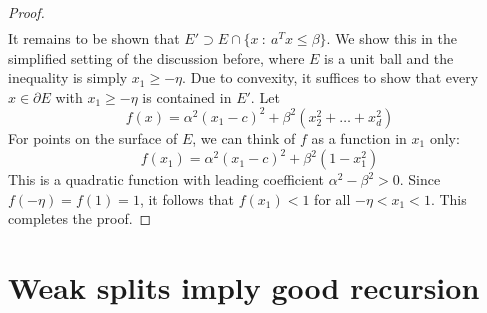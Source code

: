 \begin{proof}
\begin{align*}
  \end{align*}
  It remains to be shown that $E' \supset E \cap \{ x ~:~ a^Tx \leq \beta \}$.
  We show this in the simplified setting of the discussion before,
  where $E$ is a unit ball and the inequality is simply $x_1 \geq -\eta$.
  Due to convexity, it suffices to show that every $x \in \partial E$ with $x_1 \geq -\eta$ is contained in $E'$.
  Let
  \[
    f(x) = \alpha^2 (x_1-c)^2 + \beta^2(x_2^2 + \dots + x_d^2)
  \]
  For points on the surface of $E$, we can think of $f$ as a function in $x_1$ only:
  \[
    f(x_1) = \alpha^2 (x_1-c)^2 + \beta^2(1-x_1^2)
  \]
  This is a quadratic function with leading coefficient $\alpha^2 - \beta^2 > 0$.
  Since $f(-\eta) = f(1) = 1$, it follows that $f(x_1) < 1$ for all $-\eta < x_1 < 1$.
  This completes the proof.
\end{proof}








\section{Weak splits imply good recursion}




